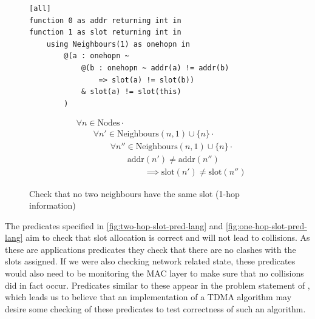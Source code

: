 \begin{figure}[H]
\begin{minipage}{.5\linewidth}
\begin{lstlisting}[language=Hoppy]
[all]
function 0 as addr returning int in
function 1 as slot returning int in
    using Neighbours(1) as onehopn in
        @(a : onehopn ~
            @(b : onehopn ~ addr(a) != addr(b)
                => slot(a) != slot(b))
            & slot(a) != slot(this)
        )
\end{lstlisting}
\end{minipage}%
\begin{minipage}{.5\linewidth}
\begin{align*}
&				\forall n \in \text{Nodes} \cdot \\
& \hspace{2em}		\forall n' \in \text{Neighbours}(n, 1) \cup \{n\} \cdot \\
& \hspace{4em}			\forall n'' \in \text{Neighbours}(n, 1) \cup \{n\} \cdot \\
& \hspace{6em}				\text{addr}(n') \not= \text{addr}(n'') \\
& \hspace{8em}					\implies \text{slot}(n') \neq \text{slot}(n'')
\end{align*}
\end{minipage}
\caption{Check that no two neighbours have the same slot (1-hop information)}
\label{fig:one-hop-slot-pred-lang}
\end{figure}


The predicates specified in \autoref{fig:two-hop-slot-pred-lang} and \autoref{fig:one-hop-slot-pred-lang} aim to check that slot allocation is correct and will not lead to collisions. As these are applications predicates they check that there are no clashes with the slots assigned. If we were also checking network related state, these predicates would also need to be monitoring the MAC layer to make sure that no collisions did in fact occur. Predicates similar to these appear in the problem statement of \cite{DBLP:journals/corr/abs-0808-0920}, which leads us to believe that an implementation of a TDMA algorithm may desire some checking of these predicates to test correctness of such an algorithm.

